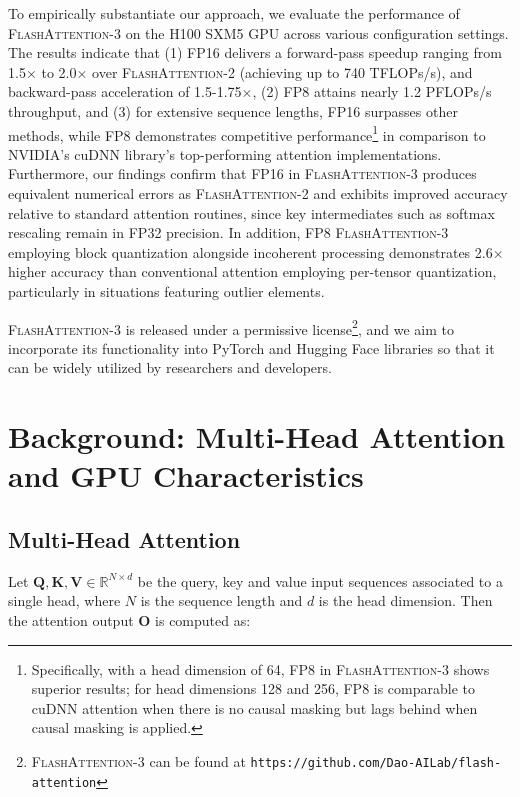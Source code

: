 To empirically substantiate our approach, we evaluate the performance of \textsc{FlashAttention-3} on the H100 SXM5 GPU across various configuration settings. The results indicate that (1) FP16 delivers a forward-pass speedup ranging from 1.5$\times$ to 2.0$\times$ over \textsc{FlashAttention-2} (achieving up to 740 TFLOPs/s), and backward-pass acceleration of 1.5-1.75$\times$, (2) FP8 attains nearly 1.2 PFLOPs/s throughput, and (3) for extensive sequence lengths, FP16 surpasses other methods, while FP8 demonstrates competitive performance\footnote{Specifically, with a head dimension of 64, FP8 in \textsc{FlashAttention-3} shows superior results; for head dimensions 128 and 256, FP8 is comparable to cuDNN attention when there is no causal masking but lags behind when causal masking is applied.} in comparison to NVIDIA’s cuDNN library's top-performing attention implementations. Furthermore, our findings confirm that FP16 in \textsc{FlashAttention-3} produces equivalent numerical errors as \textsc{FlashAttention-2} and exhibits improved accuracy relative to standard attention routines, since key intermediates such as softmax rescaling remain in FP32 precision. In addition, FP8 \textsc{FlashAttention-3} employing block quantization alongside incoherent processing demonstrates 2.6$\times$ higher accuracy than conventional attention employing per-tensor quantization, particularly in situations featuring outlier elements.

\textsc{FlashAttention-3} is released under a permissive license\footnote{\textsc{FlashAttention-3} can be found at \texttt{https://github.com/Dao-AILab/flash-attention}}, and we aim to incorporate its functionality into PyTorch and Hugging Face libraries so that it can be widely utilized by researchers and developers.

\section{Background: Multi-Head Attention and GPU Characteristics}
\label{sec:background}

\subsection{Multi-Head Attention}
\label{subsec:multi_head_attn}

Let $\mathbf{Q}, \mathbf{K}, \mathbf{V} \in \mathbb{R}^{N \times d}$ be the query, key and value input sequences associated to a single head, where $N$ is the sequence length and $d$ is the head dimension. Then the attention output $\mathbf{O}$ is computed as:


